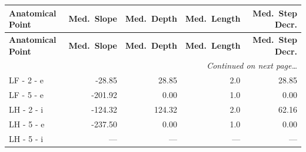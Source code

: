 \documentclass[a4paper,11pt]{article}
\begin{document}
\begin{small}
\begin{longtable}{p{4.5cm}rrrr}
\toprule
\textbf{Anatomical Point} &
\textbf{Med.\ Slope} &
\textbf{Med.\ Depth} &
\textbf{Med.\ Length} &
\textbf{Med.\ Step Decr.} \\
\midrule
\endfirsthead
\toprule
\textbf{Anatomical Point} &
\textbf{Med.\ Slope} &
\textbf{Med.\ Depth} &
\textbf{Med.\ Length} &
\textbf{Med.\ Step Decr.} \\
\midrule
\endhead
\midrule
\multicolumn{5}{r}{\small\emph{Continued on next page\ldots}} \\
\endfoot
\bottomrule
\endlastfoot
LF - 2 - e & -28.85 & 28.85 & 2.0 & 28.85 \\
LF - 5 - e & -201.92 & 0.00 & 1.0 & 0.00 \\
LH - 2 - i & -124.32 & 124.32 & 2.0 & 62.16 \\
LH - 5 - e & -237.50 & 0.00 & 1.0 & 0.00 \\
LH - 5 - i & --- & --- & --- & --- \\
\end{longtable}
\end{small}
\end{document}
